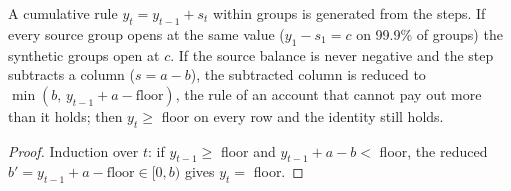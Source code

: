 \begin{proposition}\label{prop:cumulative}
A cumulative rule $y_t=y_{t-1}+s_t$ within groups is generated from the steps. If every source group opens at the same value ($y_1-s_1=c$ on 99.9\% of groups) the synthetic groups open at $c$. If the source balance is never negative and the step subtracts a column ($s=a-b$), the subtracted column is reduced to $\min(b,\,y_{t-1}+a-\text{floor})$, the rule of an account that cannot pay out more than it holds; then $y_t\ge$ floor on every row and the identity still holds.
\end{proposition}
\begin{proof}
Induction over $t$: if $y_{t-1}\ge$ floor and $y_{t-1}+a-b<$ floor, the reduced $b'=y_{t-1}+a-\text{floor}\in[0,b)$ gives $y_t=$ floor.
\end{proof}

